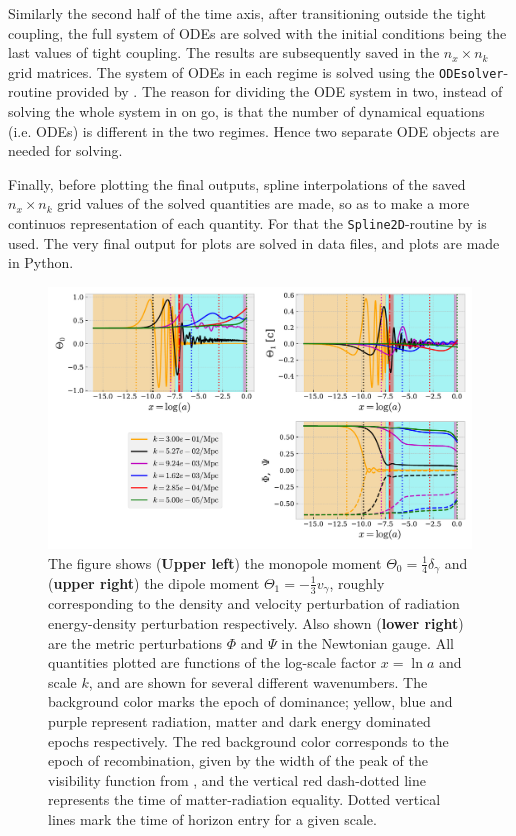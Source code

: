 \documentclass[twocolumn]{aastex62}
\begin{document}
Similarly the second half of the time axis, after transitioning outside the tight coupling, the full system of ODEs are solved with the initial conditions being the last values of tight coupling. The results are subsequently saved in the $n_x\times n_k$ grid matrices. The system of ODEs in each regime is solved using the \texttt{ODEsolver}-routine provided by \cite{winther:2020b}. The reason for dividing the ODE system in two, instead of solving the whole system in on go, is that the number of dynamical equations (i.e. ODEs) is different in the two regimes. Hence two separate ODE objects are needed for solving. 

Finally, before plotting the final outputs, spline interpolations of the saved $n_x\times n_k$ grid values of the solved quantities are made, so as to make a more continuos representation of each quantity. For that the \texttt{Spline2D}-routine by \cite{winther:2020b} is used. The very final output for plots are solved in data files, and plots are made in Python.



\begin{figure}
    \includegraphics[scale = 0.65]{Figures/fig1.pdf}
    \caption{The figure shows (\textbf{Upper left}) the monopole moment $\Theta_0 = \frac{1}{4}\delta_\gamma$ and (\textbf{upper right}) the dipole moment $\Theta_1 = -\frac{1}{3}v_\gamma$, roughly corresponding to the density and velocity perturbation of radiation energy-density perturbation respectively. Also shown (\textbf{lower right}) are the metric perturbations $\Phi$ and $\Psi$ in the Newtonian gauge. All quantities plotted are functions of the log-scale factor $x = \ln a$ and scale $k$, and are shown for several different wavenumbers. The background color marks the epoch of dominance; yellow, blue and purple represent radiation, matter and dark energy dominated epochs respectively. The red background color corresponds to the epoch of recombination, given by the width of the peak of the visibility function from \cite{stutzer:2020b}, and the vertical red dash-dotted line represents the time of matter-radiation equality. Dotted vertical lines mark the time of horizon entry for a given scale.} 
    \label{fig:fig1}
\end{figure}
\end{document}
